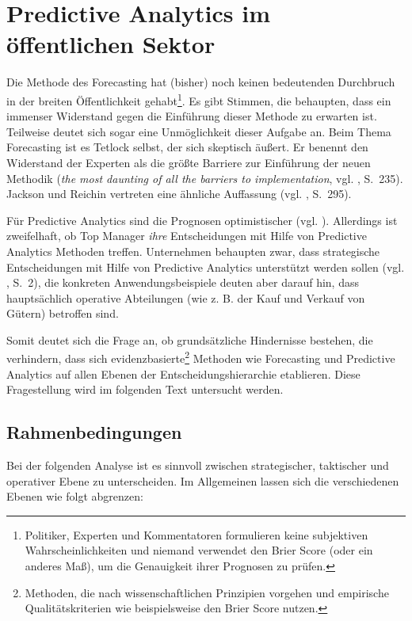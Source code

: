 \chapter{Predictive Analytics im öffentlichen Sektor}

Die Methode des Forecasting hat (bisher) noch keinen bedeutenden Durchbruch in
der breiten Öffentlichkeit gehabt\footnote{
Politiker, Experten und Kommentatoren formulieren keine subjektiven Wahrscheinlichkeiten und
niemand verwendet den Brier Score (oder ein anderes Maß), um die Genauigkeit ihrer Prognosen
zu prüfen. 
}. Es gibt Stimmen, die behaupten, dass ein immenser Widerstand gegen die
Einführung dieser Methode zu erwarten ist. Teilweise deutet sich sogar eine
Unmöglichkeit dieser Aufgabe an. 
Beim Thema Forecasting ist es Tetlock selbst, der sich skeptisch äußert. Er
benennt den Widerstand der Experten als die größte Barriere zur Einführung der
neuen Methodik (\emph{the most daunting of all the barriers to implementation},
vgl. \cite{Tetlock}, S.~235). Jackson und Reichin vertreten eine ähnliche
Auffassung (vgl. \cite{Jackson}, S.~295). 

Für Predictive Analytics sind die Prognosen optimistischer (vgl. \cite{Mauerer}).
Allerdings ist zweifelhaft, ob Top Manager \emph{ihre} Entscheidungen mit Hilfe
von Predictive Analytics Methoden treffen.
Unternehmen behaupten zwar, dass strategische Entscheidungen mit Hilfe von Predictive Analytics
unterstützt werden sollen (vgl. \cite{Mauerer}, S.~2), die konkreten Anwendungsbeispiele deuten
aber darauf hin, dass hauptsächlich operative Abteilungen (wie z. B. der Kauf und Verkauf von
Gütern) betroffen sind.

Somit deutet sich die Frage an, ob grundsätzliche Hindernisse bestehen, die verhindern, dass sich
evidenzbasierte\footnote{
Methoden, die nach wissenschaftlichen Prinzipien vorgehen und empirische Qualitätskriterien wie
beispielsweise den Brier Score nutzen.
} Methoden wie Forecasting und Predictive Analytics auf allen Ebenen der
Entscheidungshierarchie etablieren. Diese Fragestellung wird im folgenden Text untersucht werden.

\section{Rahmenbedingungen}

Bei der folgenden Analyse ist es sinnvoll zwischen strategischer, taktischer und
operativer Ebene zu unterscheiden. Im Allgemeinen lassen sich die verschiedenen
Ebenen wie folgt abgrenzen:

